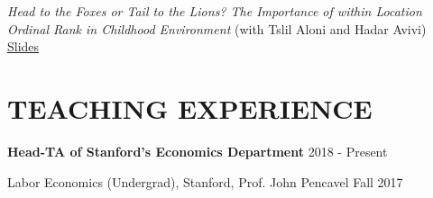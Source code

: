\documentclass[margin]{res} %
\newcommand{\rootFolder}{/Users/tomzohar/Dropbox/}
\begin{document}
\begin{resume}


\textit{Head to the Foxes or Tail to the Lions? The Importance of within Location Ordinal Rank in Childhood Environment} (with Tslil Aloni and Hadar Avivi)
\href{https://www.dropbox.com/s/ocuxvb6b11xglwv/The%20Importance%20of%20ordinal%20ranks.pdf?dl=0}{Slides}







\section{TEACHING EXPERIENCE}

 \textbf{Head-TA of Stanford's Economics Department} \hfill 2018 - Present

 Labor Economics (Undergrad), Stanford, Prof. John Pencavel \hfill Fall 2017


\end{resume}
\end{document}
